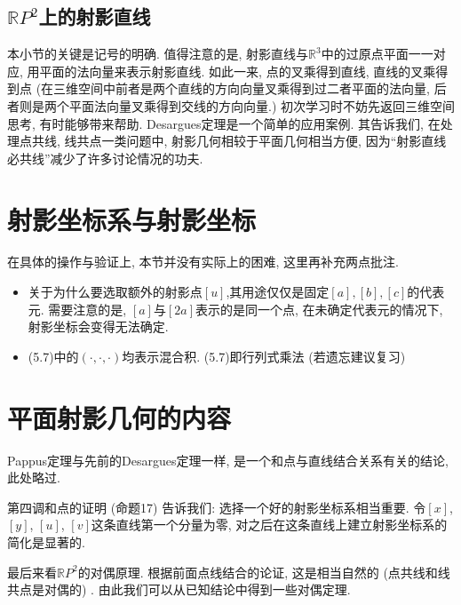 \documentclass[./main.tex]{subfiles}
\begin{document}
\subsection{\texorpdfstring{\(\mathbb{R}P ^{2}\)}{}上的射影直线}
本小节的关键是记号的明确. 值得注意的是, 射影直线与$\mathbb{R}^{3}$中的过原点平面一一对应, 用平面的法向量来表示射影直线. 如此一来, 点的叉乘得到直线, 直线的叉乘得到点 (在三维空间中前者是两个直线的方向向量叉乘得到过二者平面的法向量, 后者则是两个平面法向量叉乘得到交线的方向向量.) 初次学习时不妨先返回三维空间思考, 有时能够带来帮助. Desargues定理是一个简单的应用案例. 其告诉我们, 在处理点共线, 线共点一类问题中, 射影几何相较于平面几何相当方便, 因为``射影直线必共线''减少了许多讨论情况的功夫. 
\section{射影坐标系与射影坐标}
在具体的操作与验证上, 本节并没有实际上的困难, 这里再补充两点批注.
\begin{itemize}
\item 关于为什么要选取额外的射影点$[u]$,其用途仅仅是固定$[a],[b],[c]$的代表元. 需要注意的是, $[a]$与$[2a]$表示的是同一个点, 在未确定代表元的情况下, 射影坐标会变得无法确定. 

\item (5.7)中的$\left(\cdot,\cdot,\cdot\right) $均表示混合积. (5.7)即行列式乘法 (若遗忘建议复习) 
\end{itemize}
\section{平面射影几何的内容}
Pappus定理与先前的Desargues定理一样, 是一个和点与直线结合关系有关的结论, 此处略过.

第四调和点的证明 (命题17) 告诉我们: 选择一个好的射影坐标系相当重要. 令$[x]$, $[y]$, $[u]$, $[v]$这条直线第一个分量为零, 对之后在这条直线上建立射影坐标系的简化是显著的. 

最后来看$\mathbb{R}P ^{2}$的对偶原理. 根据前面点线结合的论证, 这是相当自然的 (点共线和线共点是对偶的) . 由此我们可以从已知结论中得到一些对偶定理. 
\end{document}
